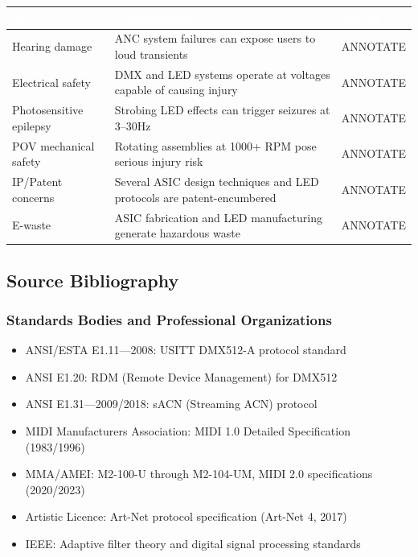 \documentclass[11pt,letterpaper]{article}
\newcommand{\tableheader}[1]{\textbf{\sffamily\textcolor{white}{#1}}}
\begin{document}
\begin{center}
\begin{tabularx}{\textwidth}{L{3.5cm}XC{2cm}}
\toprule
{}
\tableheader{Area} & \tableheader{Consideration} & \tableheader{Action} \\
\midrule
Hearing damage & ANC system failures can expose users to loud transients & ANNOTATE \\
Electrical safety & DMX and LED systems operate at voltages capable of causing injury & ANNOTATE \\
Photosensitive epilepsy & Strobing LED effects can trigger seizures at 3--30Hz & ANNOTATE \\
POV mechanical safety & Rotating assemblies at 1000+ RPM pose serious injury risk & ANNOTATE \\
IP/Patent concerns & Several ASIC design techniques and LED protocols are patent-encumbered & ANNOTATE \\
E-waste & ASIC fabrication and LED manufacturing generate hazardous waste & ANNOTATE \\
\bottomrule
\end{tabularx}
\end{center}

\subsection{Source Bibliography}

\subsubsection*{Standards Bodies and Professional Organizations}

\begin{itemize}[leftmargin=2em]
\item ANSI/ESTA E1.11---2008: USITT DMX512-A protocol standard
\item ANSI E1.20: RDM (Remote Device Management) for DMX512
\item ANSI E1.31---2009/2018: sACN (Streaming ACN) protocol
\item MIDI Manufacturers Association: MIDI 1.0 Detailed Specification (1983/1996)
\item MMA/AMEI: M2-100-U through M2-104-UM, MIDI 2.0 specifications (2020/2023)
\item Artistic Licence: Art-Net protocol specification (Art-Net 4, 2017)
\item IEEE: Adaptive filter theory and digital signal processing standards
\end{itemize}
\end{document}
